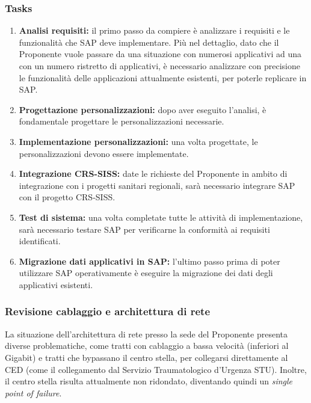                 \subsubsection*{Tasks}
                	\begin{enumerate}
                		\item \textbf{Analisi requisiti:} il primo passo da compiere è analizzare i requisiti e le funzionalità che SAP deve implementare. Più nel dettaglio, dato che il Proponente vuole passare da una situazione con numerosi applicativi ad una con un numero ristretto di applicativi, è necessario analizzare con precisione le funzionalità delle applicazioni attualmente esistenti, per poterle replicare in SAP.
                        \item \textbf{Progettazione personalizzazioni:} dopo aver eseguito l'analisi, è fondamentale progettare le personalizzazioni necessarie.
                        \item \textbf{Implementazione personalizzazioni:} una volta progettate, le personalizzazioni devono essere implementate.
                        \item \textbf{Integrazione CRS-SISS:} date le richieste del Proponente in ambito di integrazione con i progetti sanitari regionali, sarà necessario integrare SAP con il progetto CRS-SISS.
                        \item \textbf{Test di sistema:} una volta completate tutte le attività di implementazione, sarà necessario testare SAP per verificarne la conformità ai requisiti identificati.
                        \item \textbf{Migrazione dati applicativi in SAP:} l'ultimo passo prima di poter utilizzare SAP operativamente è eseguire la migrazione dei dati degli applicativi esistenti.
                	\end{enumerate}
                    
                    
                \subsubsection{Revisione cablaggio e architettura di rete}
	La situazione dell'architettura di rete presso la sede del Proponente presenta diverse problematiche, come tratti con cablaggio a bassa velocità (inferiori al Gigabit) e tratti che bypassano il centro stella, per collegarsi direttamente al CED (come il collegamento dal Servizio Traumatologico d'Urgenza STU).
                    Inoltre, il centro stella risulta attualmente non ridondato, diventando quindi un \textit{single point of failure}.
                    
